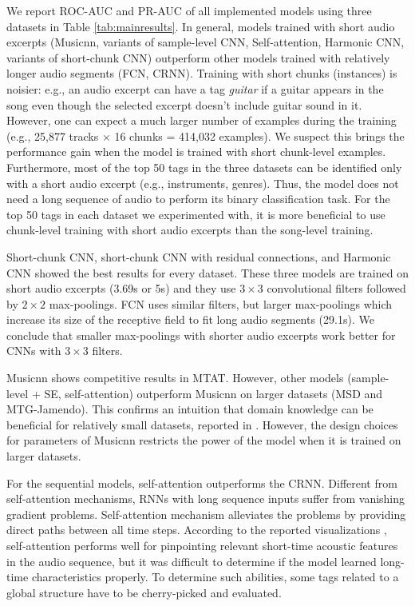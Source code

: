 \documentclass{article}
\begin{document}
We report ROC-AUC and PR-AUC of all implemented models using three datasets in Table \ref{tab:mainresults}. In general, models trained with short audio excerpts (Musicnn, variants of sample-level CNN, Self-attention, Harmonic CNN, variants of short-chunk CNN) outperform other models trained with relatively longer audio segments (FCN, CRNN). Training with short chunks (instances) is noisier: e.g., an audio excerpt can have a tag \textit{guitar} if a guitar appears in the song even though the selected excerpt doesn't include guitar sound in it. However, one can expect a much larger number of examples during the training (e.g., 25,877 tracks $\times$ 16 chunks = 414,032 examples). We suspect this brings the performance gain when the model is trained with short chunk-level examples. Furthermore, most of the top 50 tags in the three datasets can be identified only with a short audio excerpt (e.g., instruments, genres). Thus, the model does not need a long sequence of audio to perform its binary classification task. For the top 50 tags in each dataset we experimented with, it is more beneficial to use chunk-level training with short audio excerpts than the song-level training.


Short-chunk CNN, short-chunk CNN with residual connections, and Harmonic CNN showed the best results for every dataset. These three models are trained on short audio excerpts (3.69s or 5s) and they use $3 \times 3$ convolutional filters followed by $2 \times 2$ max-poolings. 
FCN uses similar filters, but larger max-poolings which increase its size of the receptive field to fit long audio segments (29.1s). We conclude that smaller max-poolings with shorter audio excerpts work better for CNNs with $3 \times 3$ filters. 




Musicnn shows competitive results in MTAT. However, other models (sample-level + SE, self-attention) outperform Musicnn on larger datasets (MSD and MTG-Jamendo). This confirms an intuition that domain knowledge can be beneficial for relatively small datasets, reported in \cite{pons2018end}. However, the design choices for parameters of Musicnn restricts the power of the model when it is trained on larger datasets.


For the sequential models, self-attention outperforms the CRNN. Different from self-attention mechanisms, RNNs with long sequence inputs suffer from vanishing gradient problems. Self-attention mechanism alleviates the problems by providing direct paths between all time steps. According to the reported visualizations \cite{won2019toward}, self-attention performs well for pinpointing relevant short-time acoustic features in the audio sequence, but it was difficult to determine if the model learned long-time characteristics properly. To determine such abilities, some tags related to a global structure have to be cherry-picked and evaluated.
\end{document}
